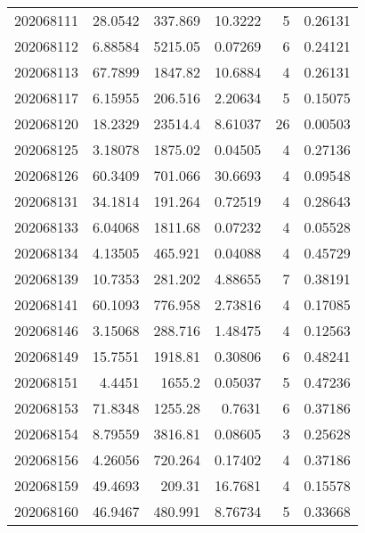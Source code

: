 \begin{tabular}{rrrrrr}
 202068111 &         28.0542  &      337.869  &           10.3222  &           5 & 0.26131 \\
 202068112 &          6.88584 &     5215.05   &            0.07269 &           6 & 0.24121 \\
 202068113 &         67.7899  &     1847.82   &           10.6884  &           4 & 0.26131 \\
 202068117 &          6.15955 &      206.516  &            2.20634 &           5 & 0.15075 \\
 202068120 &         18.2329  &    23514.4    &            8.61037 &          26 & 0.00503 \\
 202068125 &          3.18078 &     1875.02   &            0.04505 &           4 & 0.27136 \\
 202068126 &         60.3409  &      701.066  &           30.6693  &           4 & 0.09548 \\
 202068131 &         34.1814  &      191.264  &            0.72519 &           4 & 0.28643 \\
 202068133 &          6.04068 &     1811.68   &            0.07232 &           4 & 0.05528 \\
 202068134 &          4.13505 &      465.921  &            0.04088 &           4 & 0.45729 \\
 202068139 &         10.7353  &      281.202  &            4.88655 &           7 & 0.38191 \\
 202068141 &         60.1093  &      776.958  &            2.73816 &           4 & 0.17085 \\
 202068146 &          3.15068 &      288.716  &            1.48475 &           4 & 0.12563 \\
 202068149 &         15.7551  &     1918.81   &            0.30806 &           6 & 0.48241 \\
 202068151 &          4.4451  &     1655.2    &            0.05037 &           5 & 0.47236 \\
 202068153 &         71.8348  &     1255.28   &            0.7631  &           6 & 0.37186 \\
 202068154 &          8.79559 &     3816.81   &            0.08605 &           3 & 0.25628 \\
 202068156 &          4.26056 &      720.264  &            0.17402 &           4 & 0.37186 \\
 202068159 &         49.4693  &      209.31   &           16.7681  &           4 & 0.15578 \\
 202068160 &         46.9467  &      480.991  &            8.76734 &           5 & 0.33668 \\

\end{tabular}
